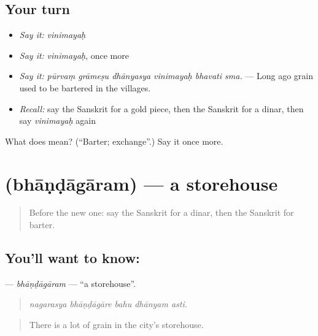 \subsection*{Your turn}
\begin{itemize}
\raggedright
  \item \emph{Say it:} \emph{vinimayaḥ}
  \item \emph{Say it:} \emph{vinimayaḥ}, once more
  \item \emph{Say it:} \emph{pūrvaṃ grāmeṣu dhānyasya vinimayaḥ bhavati sma.} — Long ago grain used to be bartered in the villages.
  \item \emph{Recall:} say the Sanskrit for a gold piece, then the Sanskrit for a dinar, then say \emph{vinimayaḥ} again
\end{itemize}

\begin{tcolorbox}[breakable,colback=teal!4,colframe=teal!35!black,title={Before you move on}]
What does  mean? (\textquotedblleft{}Barter; exchange\textquotedblright{}.) Say it once more.
\end{tcolorbox}
\section[\texorpdfstring{\sk{भाण्डागारम्} (bhāṇḍāgāram)}{भाण्डागारम् (bhāṇḍāgāram)}]{ (bhāṇḍāgāram) — a storehouse}

\label{lesson:SA-C435-bhandagaram}



\begin{quote}
Before the new one: say the Sanskrit for a dinar, then the Sanskrit for barter.
\end{quote}

\subsection*{You'll want to know: }
\textbf{} — \emph{bhāṇḍāgāram} — \textquotedblleft{}a storehouse\textquotedblright{}.

\begin{quote}
    
\end{quote}

\begin{quote}
\emph{nagarasya bhāṇḍāgāre bahu dhānyam asti.}
\end{quote}

\begin{quote}
There is a lot of grain in the city's storehouse.
\end{quote}

